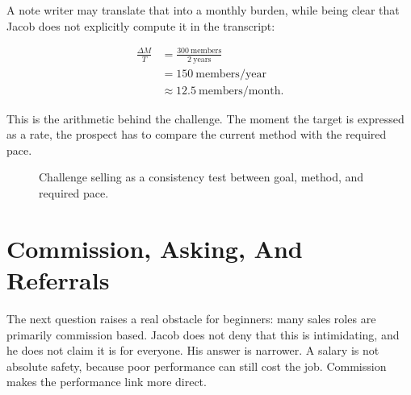 A note writer may translate that into a monthly burden, while being clear that Jacob does not explicitly compute it in the transcript:

\begin{align}
\frac{\Delta M}{T}
&=
\frac{300\ \mathrm{members}}{2\ \mathrm{years}} \\
&=
150\ \mathrm{members/year} \\
&\approx
12.5\ \mathrm{members/month}.
\end{align}

This is the arithmetic behind the challenge. The moment the target is expressed as a rate, the prospect has to compare the current method with the required pace.

\begin{figure}
\centering
{}
\caption{Challenge selling as a consistency test between goal, method, and required pace.}
\end{figure}

\section{Commission, Asking, And Referrals}

The next question raises a real obstacle for beginners: many sales roles are primarily commission based. Jacob does not deny that this is intimidating, and he does not claim it is for everyone. His answer is narrower. A salary is not absolute safety, because poor performance can still cost the job. Commission makes the performance link more direct.

